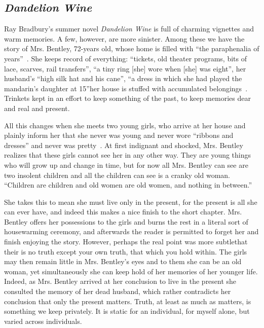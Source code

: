 \vspace{1cm}
\subsection{\emph{Dandelion Wine}}
Ray Bradbury's summer novel \emph{Dandelion Wine} is full of charming vignettes and warm memories.
A few, however, are more sinister.
Among these we have the story of Mrs. Bentley, 72-years old, whose home is filled with ``the paraphenalia of years''~\cite[50]{bradbury}.
She keeps record of everything: ``tickets, old theater programs, bits of lace, scarves, rail transfers'', ``a tiny ring [she] wore when [she] was eight'', her husband's ``high silk hat and his cane'', ``a dress in which she had played the mandarin's daughter at 15''\textemdash her house is stuffed with accumulated belongings~\cite[50-56]{bradbury}.
Trinkets kept in an effort to keep something of the past, to keep memories dear and real and present.

All this changes when she meets two young girls, who arrive at her house and plainly inform her that she never was young and never wore ``ribbons and dresses'' and never was pretty~\cite[57]{bradbury}.
At first indignant and shocked, Mrs. Bentley realizes that these girls cannot see her in any other way. 
They are young things who will grow up and change in time, but for now all Mrs. Bentley can see are two insolent children and all the children can see is a cranky old woman.
``Children are children and old women are old women, and nothing in between.''\cite[54]{bradbury}

She takes this to mean she must live only in the present, for the present is all she can ever have, and indeed this makes a nice finish to the short chapter.
Mrs. Bentley offers her possessions to the girls and burns the rest in a literal sort of housewarming ceremony, and afterwards the reader is permitted to forget her and finish enjoying the story.
However, perhaps the real point was more subtle\textemdash that their is no truth except your own truth, that which you hold within. 
The girls may then remain little in Mrs. Bentley's eyes and to them she can be an old woman, yet simultaneously she can keep hold of her memories of her younger life.
Indeed, as Mrs. Bentley arrived at her conclusion to live in the present she consulted the memory of her dead husband, which rather contradicts her conclusion that only the present matters.
Truth, at least as much as matters, is something we keep privately.
It is static for an individual, for myself alone, but varied across individuals.


